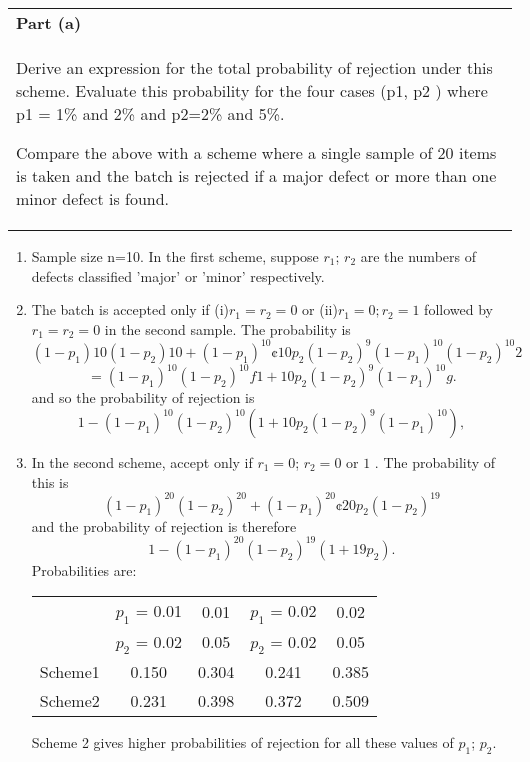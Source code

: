 \documentclass[a4paper,12pt]{article}
\begin{document}
\begin{table}[ht!]
     \centering
     \begin{tabular}{|p{15cm}|}
     \hline        
 \noindent \textbf{Part (a)}\\
Derive an expression for the total probability of rejection under this scheme. 
Evaluate this probability for the four cases (p1, p2 ) where p1 = 1\% and 2\% and p2=2\% and 5\%.

Compare the above with a scheme where a single sample of 20 items is taken and the batch is rejected if a major defect or more than one minor defect is found.
\\ \hline
 \end{tabular}
\end{table}
\begin{enumerate}
    \item Sample size n=10. In the first scheme, suppose $r_1$; $r_2$ are the numbers of defects classified
’major’ or ’minor’ respectively.
\item The batch is accepted only if (i)$r_1 = r_2 = 0$ or (ii)$r_1 = 0; r_2 = 1$ followed by $r_1 = r_2 = 0$ in the
second sample.
The probability is \[(1 - p_1)10(1 - p_2)10 + (1 - p_1)^{10} ¢ 10p_2(1 - p_2)^9(1 - p_1)^{10}(1 - p_2)^{10}
2\]
\[= (1 - p_1)^{10}(1 - p_2)^{10}f1 + 10p_2(1 - p_2)^{9}(1 - p_1)^{10}g .\]
and so the probability of rejection is
\[1 - (1 - p_1)^{10}(1 - p_2)^{10}(1 + 10p_2(1 - p_2)^9(1 - p_1)^{10}),\]
\item In the second scheme, accept only if $r_1 = 0$; $r_2 = 0$ or $1$ .
The probability of this is \[(1 - p_1)^{20}(1-p_2)^{20} + (1 - p_1)^{20} ¢ 20p_2(1 -p_2)^{19}\] and the probability of
rejection is therefore \[1 - (1 - p_1)^{20}(1 - p_2)^{19}(1 + 19p_2).\]
Probabilities are:
\begin{center}
\begin{tabular}{|c|c|c|c|c|}\hline
&$p_1$ = 0.01 & 0.01& $p_1$ = 0.02&  0.02 \\
&$p_2$ = 0.02 &0.05 & $p_2$ = 0.02&  0.05\\  \hline
Scheme1 & 0.150 & 0.304&  0.241&  0.385\\ \hline
Scheme2 & 0.231 & 0.398&  0.372&  0.509\\ \hline
\end{tabular}
\end{center}

Scheme 2 gives higher probabilities of rejection for all these values of $p_1$; $p_2$.
\end{enumerate}
\end{document}
